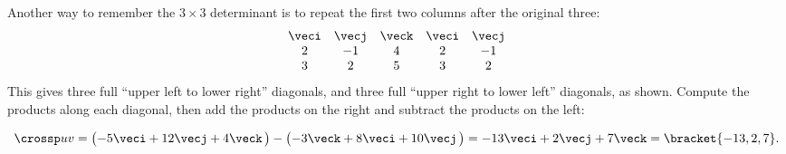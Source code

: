 

Another way to remember the $3\times3$ determinant is to
repeat the first two columns after the original three:
\[
 \begin{matrix}
  \veci&\vecj&\veck&\veci&\vecj \\
  2&-1&4&2&-1\\
  3&2&5&3&2
 \end{matrix}
\]
This gives three full ``upper left to lower right'' diagonals, and three full ``upper right to lower left'' diagonals, as shown. Compute the products along each diagonal, then add the products on the right and subtract the products on the left:

\begin{center}\end{center}
\[\crossp uv = \bigl(-5\veci+12\vecj+4\veck\,\bigr) - \bigl(-3\veck+8\veci+10\vecj\,\bigr) = -13\veci+2\vecj+7\veck =\bracket{-13,2,7}.\]

